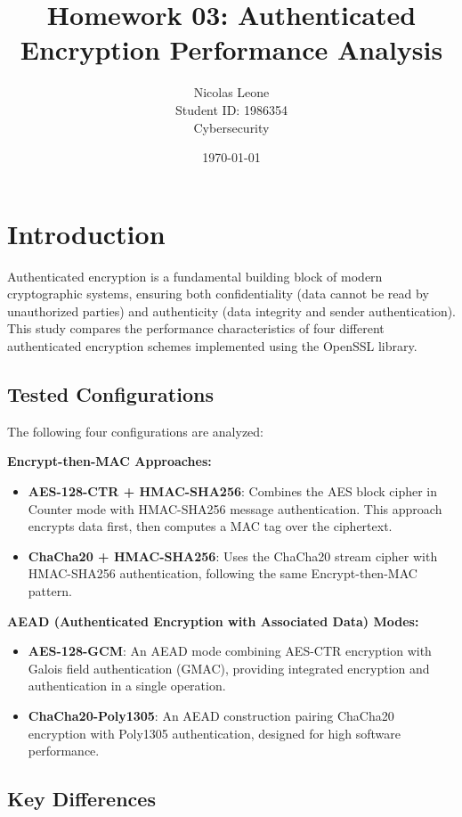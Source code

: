 \documentclass[12pt,a4paper]{article}
\title{Homework 03: Authenticated Encryption Performance Analysis}
\author{Nicolas Leone\\Student ID: 1986354\\Cybersecurity}
\date{\today}
\begin{document}
\maketitle

\tableofcontents
\clearpage
\newpage

\section{Introduction}

Authenticated encryption is a fundamental building block of modern cryptographic systems, ensuring both confidentiality (data cannot be read by unauthorized parties) and authenticity (data integrity and sender authentication). This study compares the performance characteristics of four different authenticated encryption schemes implemented using the OpenSSL library.

\subsection{Tested Configurations}

The following four configurations are analyzed:

\textbf{Encrypt-then-MAC Approaches:}
\begin{itemize}
    \item \textbf{AES-128-CTR + HMAC-SHA256}: Combines the AES block cipher in Counter mode with HMAC-SHA256 message authentication. This approach encrypts data first, then computes a MAC tag over the ciphertext.
    \item \textbf{ChaCha20 + HMAC-SHA256}: Uses the ChaCha20 stream cipher with HMAC-SHA256 authentication, following the same Encrypt-then-MAC pattern.
\end{itemize}

\textbf{AEAD (Authenticated Encryption with Associated Data) Modes:}
\begin{itemize}
    \item \textbf{AES-128-GCM}: An AEAD mode combining AES-CTR encryption with Galois field authentication (GMAC), providing integrated encryption and authentication in a single operation.
    \item \textbf{ChaCha20-Poly1305}: An AEAD construction pairing ChaCha20 encryption with Poly1305 authentication, designed for high software performance.
\end{itemize}

\subsection{Key Differences}
\end{document}

